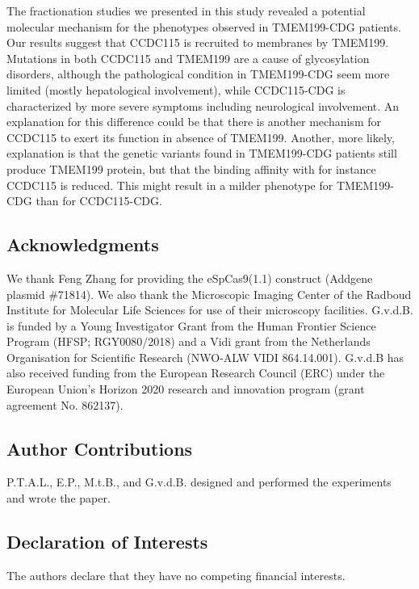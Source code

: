 The fractionation studies we presented in this study revealed a potential molecular mechanism for the phenotypes observed in TMEM199-CDG patients\cite{jansen_tmem199_2016}. Our results suggest that CCDC115 is recruited to membranes by TMEM199. Mutations in both CCDC115 and TMEM199 are a cause of glycosylation disorders, although the pathological condition in TMEM199-CDG seem more limited (mostly hepatological involvement)\cite{jansen_tmem199_2016}, while CCDC115-CDG is characterized by more severe symptoms including neurological involvement\cite{jansen_ccdc115_2016}. An explanation for this difference could be that there is another mechanism for CCDC115 to exert its function in absence of TMEM199. Another, more likely, explanation is that the genetic variants found in TMEM199-CDG patients still produce TMEM199 protein, but that the binding affinity with for instance CCDC115 is reduced. This might result in a milder phenotype for TMEM199-CDG than for CCDC115-CDG.

\subsection{Acknowledgments}

We thank Feng Zhang for providing the eSpCas9(1.1) construct (Addgene plasmid \#71814). We also thank the Microscopic Imaging Center of the Radboud Institute for Molecular Life Sciences for use of their microscopy facilities. G.v.d.B. is funded by a Young Investigator Grant from the Human Frontier Science Program (HFSP; RGY0080/2018) and a Vidi grant from the Netherlands Organisation for Scientific Research (NWO-ALW VIDI 864.14.001). G.v.d.B has also received funding from the European Research Council (ERC) under the European Union’s Horizon 2020 research and innovation program (grant agreement No. 862137).

\subsection{Author Contributions}

P.T.A.L., E.P., M.t.B., and G.v.d.B. designed and performed the experiments and wrote the paper.

\subsection{Declaration of Interests}

The authors declare that they have no competing financial interests.


